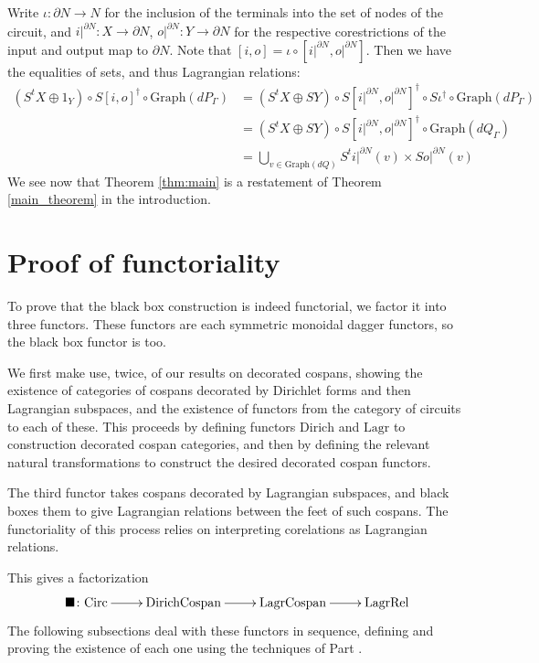 Write $\iota: \partial N \to N$ for the inclusion of the terminals into the set
of nodes of the circuit, and $i\rvert^{\partial N}: X \to \partial N$,
$o\rvert^{\partial N}: Y \to \partial N$ for the respective corestrictions of
the input and output map to $\partial N$. Note that $[i,o] = \iota \circ
[i\rvert^{\partial N}, o\rvert^{\partial N}]$.
Then we have the equalities of sets, and thus Lagrangian relations:
\begin{align*}
  (S^t\!X\oplus 1_Y) \circ S[i,o]^\dagger \circ \mathrm{Graph}(dP_\Gamma)
  &= (S^t\!X\oplus SY) \circ S[i\rvert^{\partial
  N},o\rvert^{\partial N}]^\dagger \circ S\iota^\dagger \circ \mathrm{Graph}(dP_\Gamma) \\
  &= (S^t\!X\oplus SY) \circ S[i\rvert^{\partial
  N},o\rvert^{\partial N}]^\dagger \circ \mathrm{Graph}(dQ_\Gamma) \\
  &= \bigcup_{v \in \mathrm{Graph}(dQ)} S^ti\rvert^{\partial N}(v) \times
  So\rvert^{\partial N}(v)
\end{align*}
We see now that Theorem \ref{thm:main} is a restatement of Theorem
\ref{main_theorem} in the introduction.

\section{Proof of functoriality} \label{sec:proof}
To prove that the black box construction is indeed functorial, we
factor it into three functors. These functors are each symmetric monoidal dagger
functors, so the black box functor is too.

We first make use, twice, of our results on decorated cospans, showing the
existence of categories of cospans decorated by Dirichlet forms and then
Lagrangian subspaces, and the existence of functors from the category of
circuits to each of these. This proceeds by defining functors $\mathrm{Dirich}$
and $\mathrm{Lagr}$ to construction decorated cospan categories, and then by
defining the relevant natural transformations to construct the desired decorated
cospan functors.

The third functor takes cospans decorated by Lagrangian subspaces, and black
boxes them to give Lagrangian relations between the feet of such cospans. The
functoriality of this process relies on interpreting corelations as Lagrangian
relations.

This gives a factorization
\[
  \xymatrix{
    \blacksquare\maps \Circ \ar[r] & \mathrm{DirichCospan} \ar[r] &
    \mathrm{LagrCospan} \ar[r] & \LagrRel
  }
\]
The following subsections deal with these functors in sequence, defining and
proving the existence of each one using the techniques of Part
.


